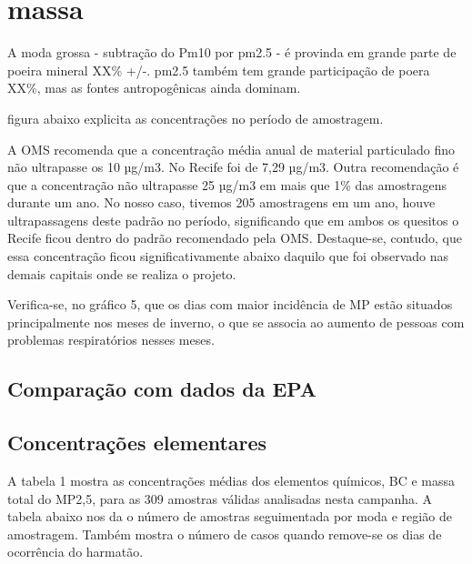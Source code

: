 \section{massa}

A moda grossa - subtração do Pm10 por pm2.5 - é provinda em grande parte
de poeira mineral XX\% +/-. pm2.5 também tem grande participação de poera XX\%, 
mas as fontes antropogênicas ainda dominam.

figura abaixo explicita as concentrações no período de amostragem.


A OMS recomenda que a concentração média anual de material particulado 
fino não ultrapasse os 10 µg/m3. No Recife foi de 7,29 µg/m3. 
Outra recomendação é que a concentração não ultrapasse 25 µg/m3 em mais que 1\% 
das amostragens durante um ano. 
No nosso caso, tivemos 205 amostragens em um ano, houve ultrapassagens deste padrão no período,
 significando que em ambos os quesitos o Recife ficou dentro do padrão recomendado pela OMS. Destaque-se, contudo, que essa concentração ficou significativamente abaixo daquilo que foi observado nas demais capitais onde se realiza o projeto.

Verifica-se, no gráfico 5, que os dias com maior incidência de MP estão situados principalmente nos meses de inverno, o que se associa ao aumento de pessoas com problemas respiratórios nesses meses.



\subsection{Comparação com dados da EPA}


\subsection{Concentrações elementares}

A tabela 1 mostra as concentrações médias dos elementos químicos, 
BC e massa total do MP2,5, para as 309 amostras válidas analisadas nesta campanha.
A tabela abaixo nos da o número de amostras seguimentada por
moda e região de amostragem. 
Também mostra o número de casos quando remove-se os dias de ocorrência do harmatão.


